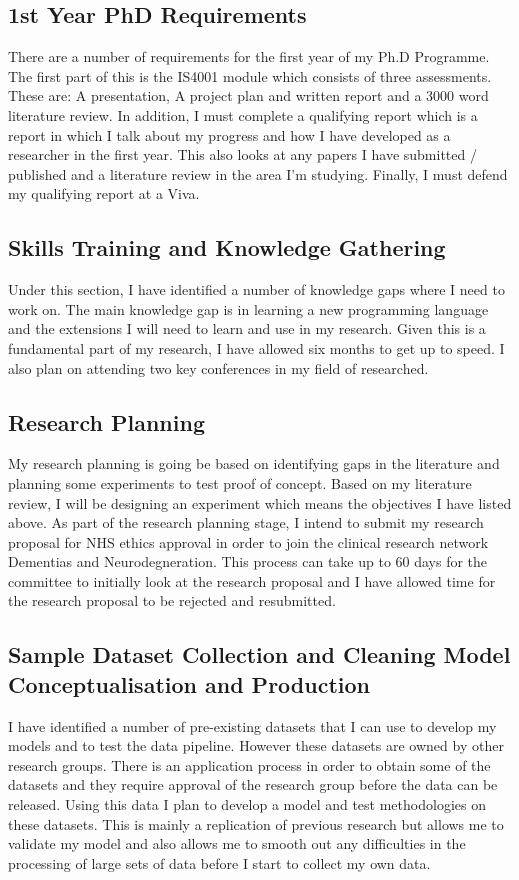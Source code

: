 \documentclass[a4paper]{article}
\begin{document}
\subsection{1st Year PhD Requirements}
There are a number of requirements for the first year of my Ph.D Programme. The first part of this is the IS4001 module which consists of three assessments. These are: A presentation, A project plan and written report and a 3000 word literature review. In addition, I must complete a qualifying report which is a report in which I talk about my progress and how I have developed as a researcher in the first year. This also looks at any papers I have submitted / published and a literature review in the area I'm studying. Finally, I must defend my qualifying report at a Viva. \newline 
\par
\subsection{Skills Training and Knowledge Gathering}
Under this section, I have identified a number of knowledge gaps where I need to work on. The main knowledge gap is in learning a new programming language and the extensions I will need to learn and use in my research. Given this is a fundamental part of my research, I have allowed six months to get up to speed. I also plan on attending two key conferences in my field of researched.\newline
\subsection{Research Planning}
My research planning is going be based on identifying gaps in the literature and planning some experiments to test proof of concept. Based on my literature review, I will be designing an experiment which means the objectives I have listed above. 
As part of the research planning stage, I intend to submit my research proposal for NHS ethics approval in order to join the clinical research network Dementias and Neurodegneration. This process can take up to 60 days for the committee to initially look at the research proposal and I have allowed time for the research proposal to be rejected and resubmitted.   \newline 
\par
\subsection{Sample Dataset Collection and Cleaning Model Conceptualisation and Production}
I have identified a number of pre-existing datasets that I can use to develop my models and to test the data pipeline. However these datasets are owned by other research groups. There is an application process in order to obtain some of the datasets and they require approval of the research group before the data can be released. Using this data I plan to develop a model and test methodologies on these datasets. This is mainly a replication of previous research but allows me to validate my model and also allows me to smooth out any difficulties in the processing of large sets of data before I start to collect my own data. \newline
\par
\end{document}
